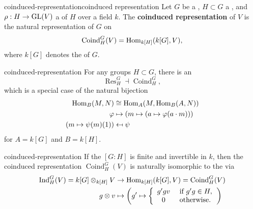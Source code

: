\begin{topic}{coinduced-representation}{coinduced representation}
    Let $G$ be a , $H \subset G$ a , and $\rho : H \to \textup{GL}(V)$ a  of $H$ over a field $k$. The \textbf{coinduced representation} of $V$ is the natural representation of $G$ on
    \[ \operatorname{Coind}_H^G(V) = \operatorname{Hom}_{k[H]}(k[G], V) , \]
    where $k[G]$ denotes the  of $G$.
\end{topic}

\begin{example}{coinduced-representation}
    For any groups $H \subset G$, there is an 
    \[ \operatorname{Res}_H^G \dashv \operatorname{Coind}_H^G , \]
    which is a special case of the natural bijection
    \[ \begin{aligned}
        \operatorname{Hom}_B(M, N) &\cong \operatorname{Hom}_A(M, \operatorname{Hom}_B(A, N)) \\
        \varphi &\mapsto (m \mapsto (a \mapsto \varphi(a \cdot m))) \\
        (m \mapsto \psi(m)(1)) &\mapsfrom \psi
    \end{aligned} \]
    for $A = k[G]$ and $B = k[H]$.
\end{example}

\begin{example}{coinduced-representation}
    If the  $[G : H]$ is finite and invertible in $k$, then the coinduced representation $\operatorname{Coind}_H^G(V)$ is naturally isomorphic to the  via
    \[ \begin{aligned}
        \operatorname{Ind}_H^G(V) = k[G] \otimes_{k[H]} V &\to \operatorname{Hom}_{k[H]}(k[G], V) = \operatorname{Coind}_H^G(V) \\
        g \otimes v &\mapsto \left(g' \mapsto \left\{ \begin{array}{cl} g'g v & \textup{ if } g'g \in H, \\ 0 & \textup{ otherwise}. \end{array} \right. \right)
    \end{aligned} \]
\end{example}

